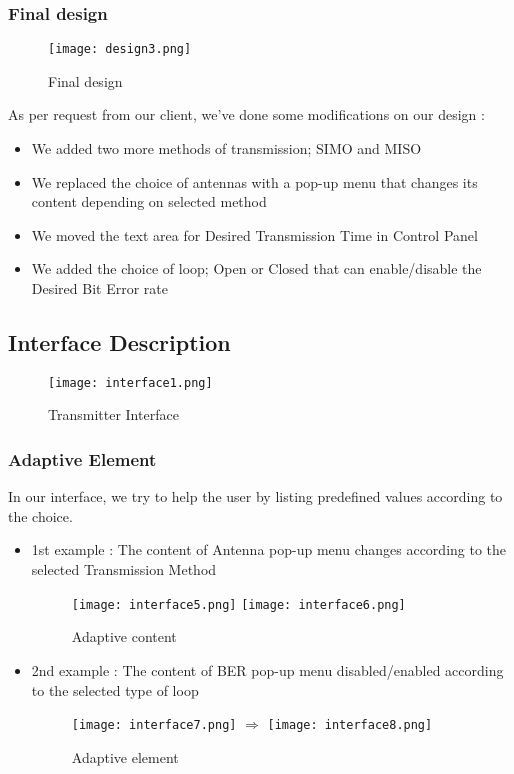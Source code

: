 \clearpage
\subsubsection{Final design}
\begin{figure}[ht]
  \centering
    \texttt{[image: design3.png]}
  \caption{Final design}
  \label{fig:design3 }
\end{figure}

\par As per request from our client, we've done some modifications on our design :
\begin{itemize}
	\item We added two more methods of transmission; SIMO and MISO
	\item We replaced the choice of antennas with a pop-up menu that changes its content depending on selected method
	\item We moved the text area for Desired Transmission Time in Control Panel
	\item We added the choice of loop; Open or Closed that can enable/disable the Desired Bit Error rate
\end{itemize}

\clearpage
\subsection{Interface Description}
\begin{figure}[ht]
  \centering
    \texttt{[image: interface1.png]}
  \caption{Transmitter Interface}
  \label{fig:interface1 }
\end{figure}
\clearpage
\subsubsection{Adaptive Element}
In our interface, we try to help the user by listing predefined values according to the choice.
\begin{itemize}
	\item 1st example : The content of Antenna pop-up menu changes according to the selected Transmission Method
	\begin{figure}[ht]
		\centering
			\texttt{[image: interface5.png]}  \texttt{[image: interface6.png]}
		\caption{Adaptive content}
		\label{fig:interface5&6 }
	\end{figure}
	\item 2nd example : The content of BER pop-up menu disabled/enabled according to the selected type of loop
	\begin{figure}[ht]
		\centering
			\texttt{[image: interface7.png]} $\Rightarrow$ \texttt{[image: interface8.png]}
		\caption{Adaptive element}
		\label{fig:interface7&8 }
	\end{figure}
\end{itemize}
\clearpage
